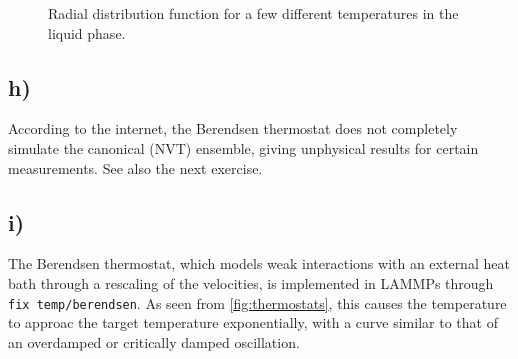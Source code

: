 \documentclass[11pt,british,a4paper]{report}
\begin{document}
\begin{figure}[htbp]
    \centering
    \caption{Radial distribution function for a few different temperatures in the liquid phase.}%
    \label{fig:rdfliquid}
\end{figure}

\subsection*{h)}
According to the internet\cite{lemak_berendsen_1994}, the Berendsen thermostat does not completely simulate the canonical (NVT) ensemble, giving unphysical results for certain measurements. See also the next exercise.

\subsection*{i)}
The Berendsen thermostat, which models weak interactions with an external heat bath through a rescaling of the velocities, is implemented in LAMMPs through \texttt{fix temp/berendsen}.
As seen from \vref{fig:thermostats}, this causes the temperature to approac the target temperature exponentially, with a curve similar to that of an overdamped or critically damped oscillation.
\end{document}
